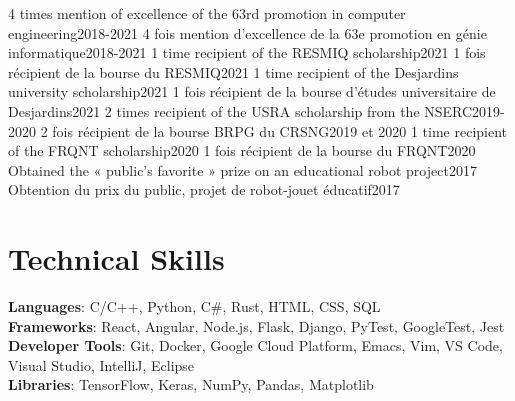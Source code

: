 \documentclass[letterpaper,11pt]{resume}
\begin{document}
    \resumeSubHeadingListStart
        \resumeDatedItemEnFr
            {4 times mention of excellence of the 63rd promotion in computer engineering}{2018-2021}
            {4 fois mention d’excellence de la 63e promotion en génie informatique}{2018-2021}
        \resumeDatedItemEnFr
            {1 time recipient of the RESMIQ scholarship}{2021}
            {1 fois récipient de la bourse du RESMIQ}{2021}
        \resumeDatedItemEnFr
            {1 time recipient of the Desjardins university scholarship}{2021}
            {1 fois récipient de la bourse d’études universitaire de Desjardins}{2021}
        \resumeDatedItemEnFr
            {2 times recipient of the USRA scholarship from the NSERC}{2019-2020}
            {2 fois récipient de la bourse BRPG du CRSNG}{2019 et 2020}
        \resumeDatedItemEnFr
            {1 time recipient of the FRQNT scholarship}{2020}
            {1 fois récipient de la bourse du FRQNT}{2020}
        \resumeDatedItemEnFr
            {Obtained the « public’s favorite » prize on an educational robot project}{2017}
            {Obtention du prix du public, projet de robot-jouet éducatif}{2017}
    \resumeSubHeadingListEnd

%
\section{Technical Skills}
 \begin{itemize}[leftmargin=0.15in, label={}]
    \small{\item{
     \textbf{Languages}{: C/C++, Python, C\#, Rust, HTML, CSS, SQL} \\
     \textbf{Frameworks}{: React, Angular, Node.js, Flask, Django, PyTest, GoogleTest, Jest} \\
     \textbf{Developer Tools}{: Git, Docker, Google Cloud Platform, Emacs, Vim, VS Code, Visual Studio, IntelliJ, Eclipse} \\
     \textbf{Libraries}{: TensorFlow, Keras, NumPy, Pandas, Matplotlib}
    }}
 \end{itemize}


\end{document}
